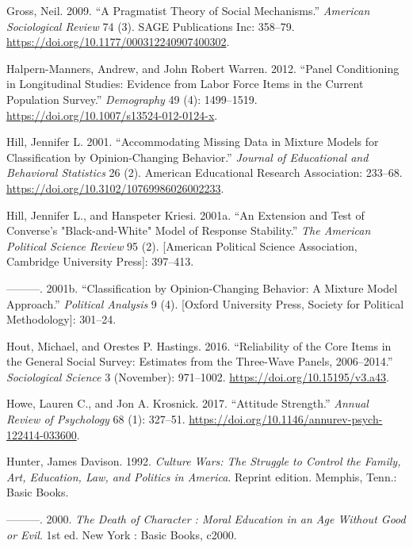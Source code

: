 \documentclass[12pt,]{article}
\begin{document}
\leavevmode\hypertarget{ref-gross2009}{}%
Gross, Neil. 2009. ``A Pragmatist Theory of Social Mechanisms.'' \emph{American Sociological Review} 74 (3). SAGE Publications Inc: 358--79. \url{https://doi.org/10.1177/000312240907400302}.

\leavevmode\hypertarget{ref-halpernmanners2012}{}%
Halpern-Manners, Andrew, and John Robert Warren. 2012. ``Panel Conditioning in Longitudinal Studies: Evidence from Labor Force Items in the Current Population Survey.'' \emph{Demography} 49 (4): 1499--1519. \url{https://doi.org/10.1007/s13524-012-0124-x}.

\leavevmode\hypertarget{ref-hill2001}{}%
Hill, Jennifer L. 2001. ``Accommodating Missing Data in Mixture Models for Classification by Opinion-Changing Behavior.'' \emph{Journal of Educational and Behavioral Statistics} 26 (2). American Educational Research Association: 233--68. \url{https://doi.org/10.3102/10769986026002233}.

\leavevmode\hypertarget{ref-hill2001a}{}%
Hill, Jennifer L., and Hanspeter Kriesi. 2001a. ``An Extension and Test of Converse's "Black-and-White" Model of Response Stability.'' \emph{The American Political Science Review} 95 (2). {[}American Political Science Association, Cambridge University Press{]}: 397--413.

\leavevmode\hypertarget{ref-hill2001b}{}%
---------. 2001b. ``Classification by Opinion-Changing Behavior: A Mixture Model Approach.'' \emph{Political Analysis} 9 (4). {[}Oxford University Press, Society for Political Methodology{]}: 301--24.

\leavevmode\hypertarget{ref-hout2016}{}%
Hout, Michael, and Orestes P. Hastings. 2016. ``Reliability of the Core Items in the General Social Survey: Estimates from the Three-Wave Panels, 2006--2014.'' \emph{Sociological Science} 3 (November): 971--1002. \url{https://doi.org/10.15195/v3.a43}.

\leavevmode\hypertarget{ref-howe2017}{}%
Howe, Lauren C., and Jon A. Krosnick. 2017. ``Attitude Strength.'' \emph{Annual Review of Psychology} 68 (1): 327--51. \url{https://doi.org/10.1146/annurev-psych-122414-033600}.

\leavevmode\hypertarget{ref-hunter1992}{}%
Hunter, James Davison. 1992. \emph{Culture Wars: The Struggle to Control the Family, Art, Education, Law, and Politics in America}. Reprint edition. Memphis, Tenn.: Basic Books.

\leavevmode\hypertarget{ref-hunter2000}{}%
---------. 2000. \emph{The Death of Character : Moral Education in an Age Without Good or Evil}. 1st ed. New York : Basic Books, c2000.
\end{document}
